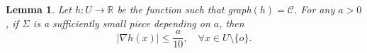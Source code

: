 \documentclass[11pt,a4paper,reqno]{amsart}
\newcommand{\R}{\mathbb{R}}
\newcommand{\calC}{\mathcal{C}}
\newcommand{\1}{\mathbf{1}}
\numberwithin{equation}{section}
\theoremstyle{plain}
\newtheorem{lemma}[equation]{Lemma}
\theoremstyle{definition}
\theoremstyle{remark}
\begin{document}
%
%
%
%
%
%
%
%
%
%


\begin{lemma} \label{smalla}
  Let $h: U \to \R$ be the function such that graph$(h)=\calC$. For any $a>0$,
  if $\Sigma$ is a sufficiently small piece depending on $a$, then
  \begin{equation}\label{10a}
    |\nabla h(x)| \le \frac{a}{10}, \quad \forall x \in U \setminus\{o\}.
  \end{equation}
\end{lemma}
\end{document}
